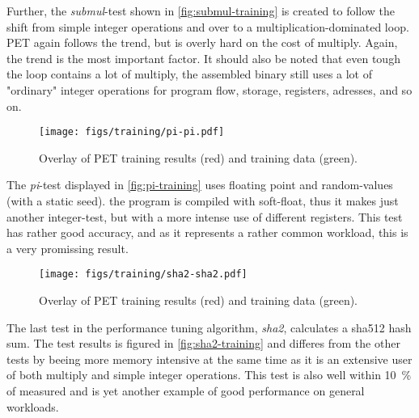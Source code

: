 Further, the \emph{submul}-test shown in \autoref{fig:submul-training} is
created to follow the shift from simple integer operations and over to
a multiplication-dominated loop. PET again follows the trend, but is
overly hard on the cost of multiply. Again, the trend is the most important
factor. It should also be noted that even tough the loop contains a lot of
multiply, the assembled binary still uses a lot of "ordinary" integer
operations for program flow, storage, registers, adresses, and so on.

\begin{figure}[htb]
    \centering
    \texttt{[image: figs/training/pi-pi.pdf]}
    \caption{Overlay of PET training results (red) and training data (green).}
    \label{fig:pi-training}
\end{figure}

The \emph{pi}-test displayed in \autoref{fig:pi-training} uses floating point
and random-values (with a static seed).  the program is compiled with
soft-float, thus it makes just another integer-test, but with a more intense use
of different registers. This test has rather good accuracy, and as it represents
a rather common workload, this is a very promissing result.

\begin{figure}[htb]
    \centering
    \texttt{[image: figs/training/sha2-sha2.pdf]}
    \caption{Overlay of PET training results (red) and training data (green).}
    \label{fig:sha2-training}
\end{figure}

The last test in the performance tuning algorithm, \emph{sha2}, calculates a
sha512 hash sum.  The test results is figured in \autoref{fig:sha2-training} and
differes from the other tests by beeing more memory intensive at the same time
as it is an extensive user of both multiply and simple integer operations. This
test is also well within 10~\% of measured and is yet another example of good
performance on general workloads.

